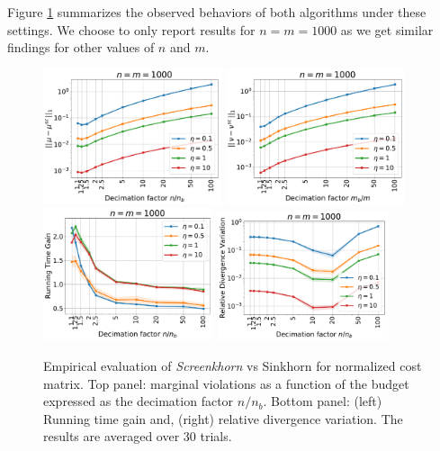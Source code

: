 Figure \ref{fig:margin_expe} summarizes the observed behaviors of both algorithms under these settings. We choose to only report results for $n=m=1000$ as we get similar findings for other values of $n$ and $m$. 

\begin{figure}[t]
	\begin{center}
		\includegraphics[width=5.25cm]{./figs/norm_M_Mu_marginals_toy_n1000} \hspace*{12pt} 
		\includegraphics[width=5.25cm]{./figs/norm_M_Nu_marginals_toy_n1000} \\
		\includegraphics[width=5cm]{./figs/norm_M_time_toy_n1000}\hspace*{18pt}
		\includegraphics[width=5cm]{./figs/norm_M_div_toy_n1000}
	\end{center}
	\caption{Empirical evaluation of \emph{Screenkhorn} vs Sinkhorn for normalized cost matrix. Top panel: marginal violations as a function of the budget expressed as the decimation factor $n/n_b$. Bottom panel: (left) Running time gain and, (right) relative divergence variation. The results are averaged over 30 trials.} 
		\label{fig:margin_expe}
\end{figure}
